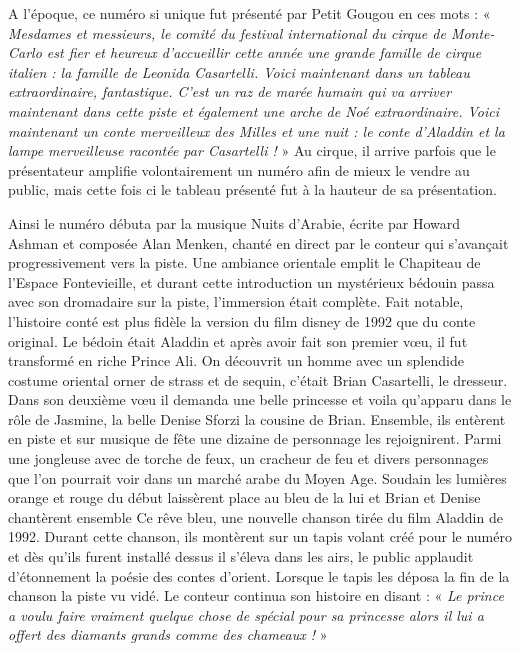 A l’époque, ce numéro si unique fut présenté par Petit Gougou en ces mots : « \textit{Mesdames et messieurs, le comité du festival international du cirque de Monte-Carlo est fier et heureux d’accueillir cette année une grande famille de cirque italien : la famille de Leonida Casartelli. Voici maintenant dans un tableau extraordinaire, fantastique. C’est un raz de marée humain qui va arriver maintenant dans cette piste et également une arche de Noé extraordinaire. Voici maintenant un conte merveilleux des Milles et une nuit : le conte d’Aladdin et la lampe merveilleuse racontée par Casartelli !} » Au cirque, il arrive parfois que le présentateur amplifie volontairement un numéro afin de mieux le vendre au public, mais cette fois ci le tableau présenté fut à la hauteur de sa présentation. 

Ainsi le numéro débuta par la musique Nuits d’Arabie, écrite par Howard Ashman et composée Alan Menken, chanté en direct par le conteur qui s’avançait progressivement vers la piste. Une ambiance orientale emplit le Chapiteau de l’Espace Fontevieille, et durant cette introduction un mystérieux bédouin passa avec son dromadaire sur la piste, l’immersion était complète. Fait notable, l’histoire conté est plus fidèle la version du film disney de 1992 que du conte original. Le bédoin était Aladdin et après avoir fait son premier vœu, il fut transformé en riche Prince Ali. On découvrit un homme avec un splendide costume oriental orner de strass et de sequin, c’était Brian Casartelli, le dresseur. Dans son deuxième vœu il demanda une belle princesse et voila qu’apparu dans le rôle de Jasmine, la belle Denise Sforzi la cousine de Brian. Ensemble, ils entèrent en piste et sur musique de fête une dizaine de personnage les rejoignirent. Parmi une jongleuse avec de torche de feux, un cracheur de feu et divers personnages que l’on pourrait voir dans un marché arabe du Moyen Age. Soudain les lumières orange et rouge du début laissèrent place au bleu de la lui et Brian et Denise chantèrent ensemble Ce rêve bleu, une nouvelle chanson tirée du film Aladdin de 1992. Durant cette chanson, ils montèrent sur un tapis volant créé pour le numéro et dès qu’ils furent installé dessus il s’éleva dans les airs, le public applaudit d’étonnement la poésie des contes d’orient. Lorsque le tapis les déposa la fin de la chanson la piste vu vidé. Le conteur continua son histoire en disant : «\textit{ Le prince a voulu faire vraiment quelque chose de spécial pour sa princesse alors il lui a offert des diamants grands comme des chameaux !} »











